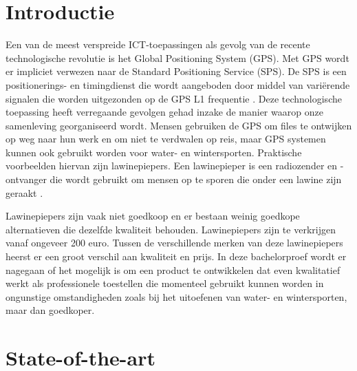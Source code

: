 
\section{Introductie} %
\label{sec:introductie}

Een van de meest verspreide ICT-toepassingen als gevolg van de recente technologische revolutie is het Global Positioning System (GPS). Met GPS wordt er impliciet verwezen naar de Standard Positioning Service (SPS). De SPS is een positionerings- en timingdienst die wordt aangeboden door middel van variërende signalen die worden uitgezonden op de GPS L1 frequentie \autocite{gps_def}.  Deze technologische toepassing heeft verregaande gevolgen gehad inzake de manier waarop onze samenleving georganiseerd wordt. Mensen gebruiken de GPS om files te ontwijken op weg naar hun werk en om niet te verdwalen op reis, maar GPS systemen kunnen ook  gebruikt worden voor water- en wintersporten. Praktische voorbeelden hiervan zijn lawinepiepers. Een lawinepieper is een radiozender en -ontvanger die wordt gebruikt om mensen op te sporen die onder een lawine zijn geraakt \autocite{avalanche_performance}. 

Lawinepiepers zijn vaak niet goedkoop en er bestaan weinig goedkope alternatieven die dezelfde kwaliteit behouden. Lawinepiepers zijn te verkrijgen vanaf ongeveer 200 euro. Tussen de verschillende merken van deze lawinepiepers heerst er een groot verschil aan kwaliteit en prijs. In deze bachelorproef wordt er nagegaan of het mogelijk is om een product te ontwikkelen dat even kwalitatief werkt als professionele toestellen die momenteel gebruikt kunnen worden in ongunstige omstandigheden zoals bij het uitoefenen van water- en wintersporten, maar dan goedkoper.



\section{State-of-the-art}
\label{sec:state-of-the-art}

